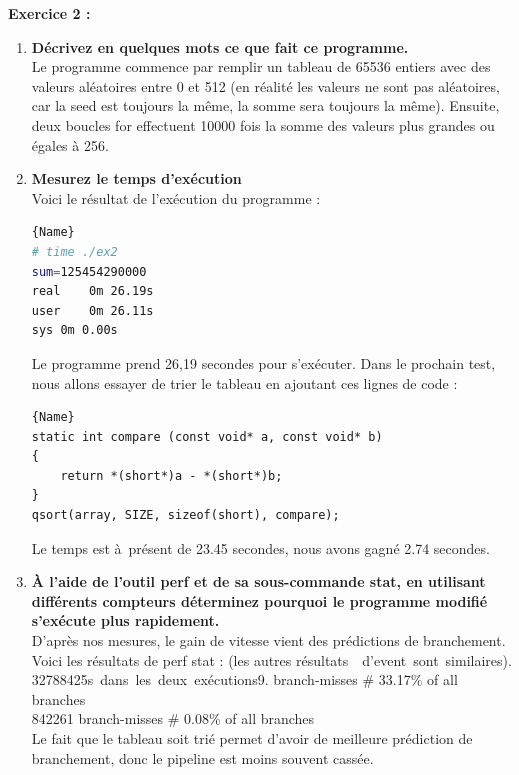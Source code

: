 \documentclass[
	a4paper, %
	10pt, %
]{CSUniSchoolLabReport}
\begin{document}
\textbf{Exercice 2 :}
\begin{enumerate}[label=\textbf{\arabic*}]

\item \textbf{Décrivez en quelques mots ce que fait ce programme.}\\
Le programme commence par remplir un tableau de 65536 entiers avec des valeurs aléatoires entre 0 et 512 (en réalité les valeurs ne sont pas aléatoires, car la seed est toujours la m\^eme, la somme sera toujours la m\^eme).
Ensuite, deux boucles for effectuent 10000 fois la somme des valeurs plus grandes ou \'egales à 256.

\item \textbf{Mesurez le temps d’exécution}\\
Voici le r\'esultat de l'ex\'ecution du programme :


\begin{lstlisting}[language=bash, firstnumber=1]{Name}
# time ./ex2 
sum=125454290000
real	0m 26.19s
user	0m 26.11s
sys	0m 0.00s
\end{lstlisting}

Le programme prend 26,19 secondes pour s'ex\'ecuter.
Dans le prochain test, nous allons essayer de trier le tableau en ajoutant ces lignes de code :
\begin{lstlisting}[style=CStyle, caption=Code modifié, firstnumber=1]{Name}
static int compare (const void* a, const void* b)
{
    return *(short*)a - *(short*)b;
}
qsort(array, SIZE, sizeof(short), compare);
\end{lstlisting}

Le temps est \`a\ pr\'esent de 23.45 secondes, nous avons gagn\'e 2.74 secondes.

\item \textbf{À l’aide de l’outil perf et de sa sous-commande stat, en utilisant différents compteurs déterminez pourquoi le programme modifié s’exécute plus rapidement.}\\

D'apr\`es nos mesures, le gain de vitesse vient des pr\'edictions de branchement.
Voici les r\'esultats de perf stat : (les autres r\'esultats\ \ d'event\ sont\ similaires).\\
32788425s\ dans\ les\ deux\ ex\'ecutions9.      branch-misses             \#   33.17\% of all branches\\
842261         branch-misses             \#    0.08\% of all branches\\

Le fait que le tableau soit trié permet d'avoir de meilleure pr\'ediction de branchement, donc le pipeline est moins souvent cassée.
\end{enumerate}
\end{document}
